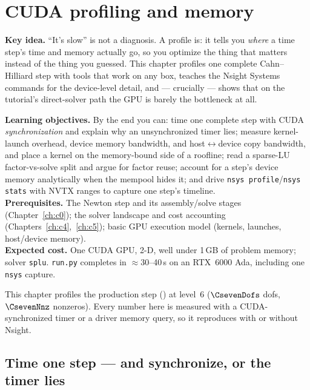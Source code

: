 \chapter{CUDA profiling and memory}
\label{ch:c7}
\begin{keybox}
\textbf{Key idea.} ``It's slow'' is not a diagnosis. A profile is: it tells you
\emph{where} a time step's time and memory actually go, so you optimize the
thing that matters instead of the thing you guessed. This chapter profiles one
complete Cahn--Hilliard step with tools that work on any box, teaches the
Nsight Systems commands for the device-level detail, and --- crucially --- shows
that on the tutorial's direct-solver path the GPU is barely the bottleneck at
all.
\end{keybox}

\begin{keybox}
\textbf{Learning objectives.} By the end you can: time one complete step with
CUDA \emph{synchronization} and explain why an unsynchronized timer lies;
measure kernel-launch overhead, device memory bandwidth, and host$\leftrightarrow$device
copy bandwidth, and place a kernel on the memory-bound side of a roofline;
read a sparse-LU factor-vs-solve split and argue for factor reuse; account for
a step's device memory analytically when the mempool hides it; and drive
\texttt{nsys profile}/\texttt{nsys stats} with NVTX ranges to capture one
step's timeline.\\[2pt]
\textbf{Prerequisites.} The Newton step and its assembly/solve stages
(Chapter~\ref{ch:c0}); the solver landscape and cost accounting
(Chapters~\ref{ch:c4},~\ref{ch:c5}); basic GPU execution model (kernels,
launches, host/device memory).\\[2pt]
\textbf{Expected cost.} One CUDA GPU, 2-D, well under 1\,GB of problem memory;
solver \texttt{splu}. \texttt{run.py} completes in $\approx$30--40\,s on an
RTX~6000 Ada, including one \texttt{nsys} capture.
\end{keybox}

This chapter profiles the production step
() at level~6 ($\CsevenDofs$ dofs,
$\CsevenNnz$ nonzeros). Every number here is measured with a CUDA-synchronized
timer or a driver memory query, so it reproduces with or without Nsight.

\section{Time one step --- and synchronize, or the timer lies}

